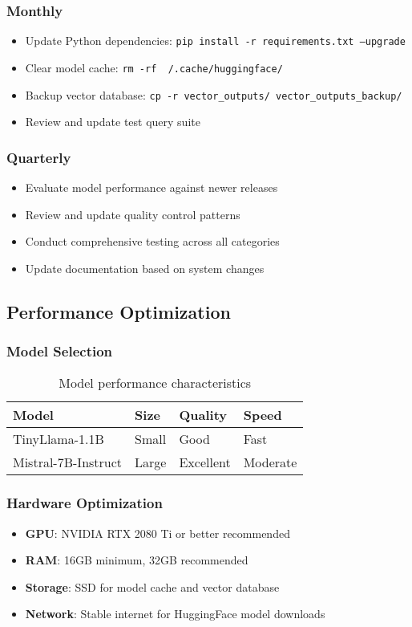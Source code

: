 \documentclass[12pt,a4paper]{article}
\begin{document}
\subsubsection{Monthly}
\begin{itemize}
    \item Update Python dependencies: \texttt{pip install -r requirements.txt --upgrade}
    \item Clear model cache: \texttt{rm -rf ~/.cache/huggingface/}
    \item Backup vector database: \texttt{cp -r vector\_outputs/ vector\_outputs\_backup/}
    \item Review and update test query suite
\end{itemize}

\subsubsection{Quarterly}
\begin{itemize}
    \item Evaluate model performance against newer releases
    \item Review and update quality control patterns
    \item Conduct comprehensive testing across all categories
    \item Update documentation based on system changes
\end{itemize}

\subsection{Performance Optimization}

\subsubsection{Model Selection}
\begin{table}[H]
\centering
\begin{tabular}{@{}llll@{}}
\toprule
\textbf{Model} & \textbf{Size} & \textbf{Quality} & \textbf{Speed} \\
\midrule
TinyLlama-1.1B & Small & Good & Fast \\
Mistral-7B-Instruct & Large & Excellent & Moderate \\
\bottomrule
\end{tabular}
\caption{Model performance characteristics}
\end{table}

\subsubsection{Hardware Optimization}
\begin{itemize}
    \item \textbf{GPU}: NVIDIA RTX 2080 Ti or better recommended
    \item \textbf{RAM}: 16GB minimum, 32GB recommended
    \item \textbf{Storage}: SSD for model cache and vector database
    \item \textbf{Network}: Stable internet for HuggingFace model downloads
\end{itemize}
\end{document}
